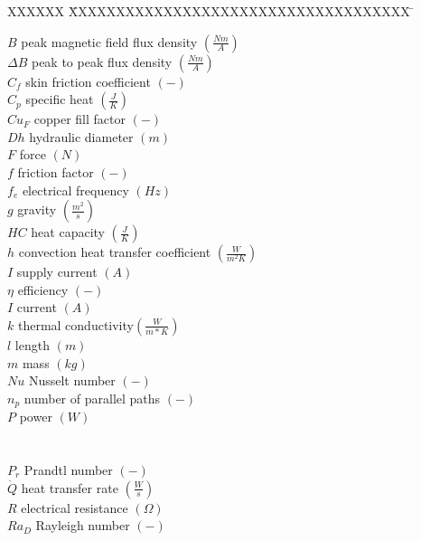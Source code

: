 \documentclass[]{aiaa-tc}%
\begin{document}
\begin{multicols}{2}
 \begin{tabbing}
  XXXXXX \= XXXXXXXXXXXXXXXXXXXXXXXXXXXXXXXXXXXX \= \kill %
  
  $B$ \> peak magnetic field flux density $(\frac{Nm}{A})$\\
  $\Delta B$ \> peak to peak flux density $(\frac{Nm}{A})$\\
  $C_f$ \> skin friction coefficient $(-)$\\
  $C_p$ \> specific heat $(\frac{J}{K})$\\
  $Cu_F$ \> copper fill factor $(-)$\\
  $Dh$ \> hydraulic diameter $(m)$\\
  $F$ \> force $(N)$\\
  $f$ \> friction factor $(-)$\\
  $f_e$ \> electrical frequency $(Hz)$\\
  $g$ \> gravity $(\frac{m^{2}}{s})$\\
  $HC$ \> heat capacity $(\frac{J}{K})$\\
  $h$ \> convection heat transfer coefficient $(\frac{W}{m^{2}K})$ \\
  $I$ \> supply current $(A)$\\
  $\eta$ \> efficiency $(-)$\\
  $I$ \> current $(A)$\\
  $k$ \> thermal conductivity$(\frac{W}{m*K})$\\
  $l$ \> length $(m)$\\
  $m$ \> mass $(kg)$\\
  $Nu$ \> Nusselt number $(-)$\\
  $n_p$ \> number of parallel paths $(-)$\\
  $P$ \> power $(W)$ \\
  \\
  \\
  $P_{r}$ \> Prandtl number $(-)$\\
  $\dot{Q}$ \> heat transfer rate $(\frac{W}{s})$ \\
  $R$ \> electrical resistance $(\Omega)$\\
  $Ra_D$ \> Rayleigh number $(-)$\\

\end{tabbing}
\end{multicols}
\end{document}
